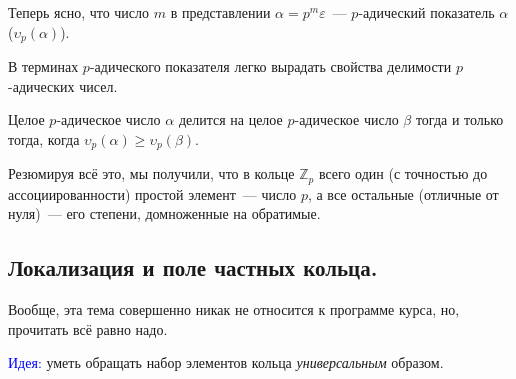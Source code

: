 \documentclass[11pt]{report}
\begin{document}
    Теперь ясно, что число $m$ в представлении $\alpha = p^m \varepsilon$~--- $p$-адический показатель $\alpha$ ($\upsilon_p(\alpha)$).

    В терминах $p$-адического показателя легко вырадать свойства делимости $p$-адических чисел.
    \begin{corollary}
        Целое $p$-адическое число $\alpha$ делится на целое $p$-адическое число $\beta$ тогда и только тогда, когда
        $\upsilon_p(\alpha) \ge \upsilon_p(\beta)$.
     \end{corollary}

    Резюмируя всё это, мы получили, что в кольце $\mathbb{Z}_p$ всего один (с точностью до ассоциированности) простой элемент~--- число $p$,
    а все остальные (отличные от нуля)~--- его степени, домноженные на обратимые.
    \subsection{Локализация и поле частных кольца.}

    Вообще, эта тема совершенно никак не относится к программе курса, но, прочитать всё равно надо.

    \textcolor{blue}{Идея:} уметь обращать набор элементов кольца \emph{универсальным} образом. \\
\end{document}
